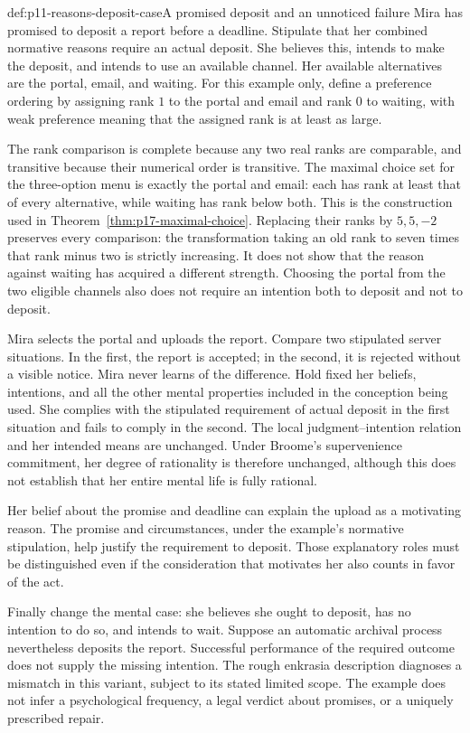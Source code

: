 \begin{hbexample}{def:p11-reasons-deposit-case}{A promised deposit and an unnoticed failure}
Mira has promised to deposit a report before a deadline. Stipulate that her
combined normative reasons require an actual deposit. She believes this,
intends to make the deposit, and intends to use an available channel.
Her available alternatives are the portal, email, and waiting. For this
example only, define a preference ordering by assigning rank \(1\) to the
portal and email and rank \(0\) to waiting, with weak preference meaning
that the assigned rank is at least as large.

The rank comparison is complete because any two real ranks are comparable,
and transitive because their numerical order is transitive. The maximal
choice set for the three-option menu is exactly the portal and email:
each has rank at least that of every alternative, while waiting has rank
below both. This is the construction used in
Theorem~\ref{thm:p17-maximal-choice}. Replacing their ranks by \(5,5,-2\)
preserves every comparison: the transformation taking an old rank to
seven times that rank minus two is strictly increasing. It does not show
that the reason against waiting has acquired a different strength.
Choosing the portal from the two eligible channels also does not require
an intention both to deposit and not to deposit.

Mira selects the portal and uploads the report. Compare two stipulated
server situations. In the first, the report is accepted; in the second,
it is rejected without a visible notice. Mira never learns of the difference.
Hold fixed her beliefs, intentions, and all the other mental properties
included in the conception being used. She complies with the stipulated requirement of actual deposit
in the first situation and fails to comply in the second. The local
judgment--intention relation and her intended means are unchanged. Under
Broome's supervenience commitment, her degree of rationality is therefore
unchanged, although this does not establish that her entire mental life
is fully rational.

Her belief about the promise and deadline can explain the upload as a
motivating reason. The promise and circumstances, under the example's
normative stipulation, help justify the requirement to deposit. Those
explanatory roles must be distinguished even if the consideration that
motivates her also counts in favor of the act.

Finally change the mental case: she believes she ought to deposit, has
no intention to do so, and intends to wait. Suppose an automatic archival
process nevertheless deposits the report. Successful performance of the
required outcome does not supply the missing intention. The rough
enkrasia description diagnoses a mismatch in this variant, subject to
its stated limited scope. The example does not infer a psychological
frequency, a legal verdict about promises, or a uniquely prescribed repair.
\end{hbexample}

